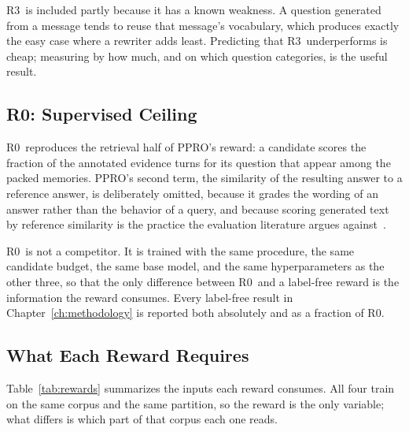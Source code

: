 \documentclass[12pt,letterpaper,oneside]{report}
\newcommand{\Rz}{R0}
\newcommand{\Rc}{R3}
\begin{document}
\Rc\ is included partly because it has a known weakness. A question generated
from a message tends to reuse that message's vocabulary, which produces exactly
the easy case where a rewriter adds least. Predicting that \Rc\ underperforms
is cheap; measuring by how much, and on which question categories, is the
useful result.

\subsection{\Rz: Supervised Ceiling}

\Rz\ reproduces the retrieval half of PPRO's reward: a candidate scores the
fraction of the annotated evidence turns for its question that appear among the
packed memories. PPRO's second term, the similarity of the resulting answer to
a reference answer, is deliberately omitted, because it grades the wording of
an answer rather than the behavior of a query, and because scoring generated
text by reference similarity is the practice the evaluation literature argues
against~\cite{hownot}.

\Rz\ is not a competitor. It is trained with the same procedure, the same
candidate budget, the same base model, and the same hyperparameters as the
other three, so that the only difference between \Rz\ and a label-free reward
is the information the reward consumes. Every label-free result in
Chapter~\ref{ch:methodology} is reported both absolutely and as a fraction of
\Rz.

\subsection{What Each Reward Requires}

Table~\ref{tab:rewards} summarizes the inputs each reward consumes. All four
train on the same corpus and the same partition, so the reward is the only
variable; what differs is which part of that corpus each one reads.
\end{document}
